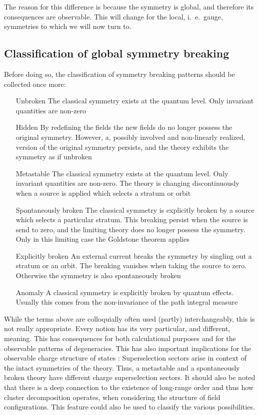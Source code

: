 \documentclass[final,12pt,3p,longtitle]{elsarticle}
\newcommand*{\1}{1\!\!\!\bot}
\begin{document}
The reason for this difference is because the symmetry is global, and therefore its consequences are observable. This will change for the local, i.\ e.\ gauge, symmetries to which we will now turn to.

\subsection{Classification of global symmetry breaking}\label{ss:classificationsb}

Before doing so, the classification of symmetry breaking patterns should be collected once more:
\begin{itemize}[leftmargin=0.2\textwidth]
 \item[Unbroken] The classical symmetry exists at the quantum level. Only invariant quantities are non-zero
 \item[Hidden] By redefining the fields the new fields do no longer possess the original symmetry. However, a, possibly involved and non-linearly realized, version of the original symmetry persists, and the theory exhibits the symmetry as if unbroken
 \item[Metastable] The classical symmetry exists at the quantum level. Only invariant quantities are non-zero. The theory is changing discontinuously when a source is applied which selects a stratum or orbit
 \item[Spontaneously broken] The classical symmetry is explicitly broken by a source which selects a particular stratum. This breaking persist when the source is send to zero, and the limiting theory does no longer possess the symmetry. Only in this limiting case the Goldstone theorem applies
 \item[Explicitly broken] An external current breaks the symmetry by singling out a stratum or an orbit. The breaking vanishes when taking the source to zero. Otherwise the symmetry is also spontaneously broken
 \item[Anomaly] A classical symmetry is explicitly broken by quantum effects. Usually this comes from the non-invariance of the path integral measure \cite{Bertlmann:1996xk}
\end{itemize}
While the terms above are colloquially often used (partly) interchangeably, this is not really appropriate. Every notion has its very particular, and different, meaning. This has consequences for both calculational purposes and for the observable patterns of degeneracies. This has also important implications for the observable charge structure of states \cite{Strocchi:2005yk}: Superselection sectors arise in context of the intact symmetries of the theory. Thus, a metastable and a spontaneously broken theory have different charge superselection sectors. It should also be noted that there is a deep connection to the existence of long-range order and thus how cluster decomposition operates, when considering the structure of field configurations. This feature could also be used to classify the various possibilities.
\end{document}
